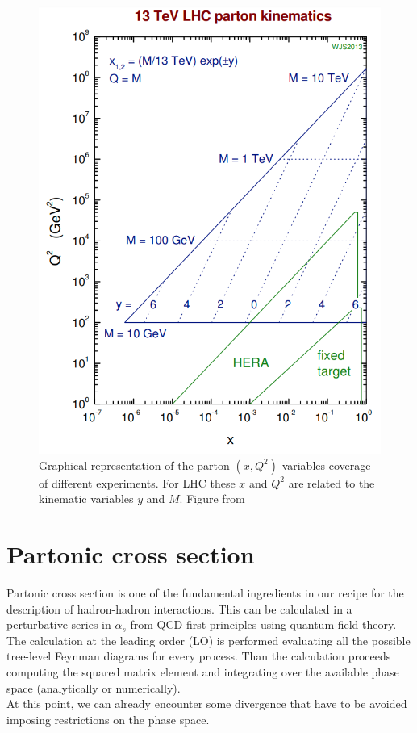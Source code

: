 \begin{figure}[!ht]
	\centering 	
	\includegraphics[width=12cm]{img/xQ2planeCoverage.png}
	\caption{Graphical representation of the parton $(x,Q^2)$ variables coverage of different experiments. For LHC these $x$ and $Q^2$ are related to the kinematic variables $y$ and $M$. Figure from \cite{StirlingPrivate}}
		\label{figure:xQ2planeCoverage}
\end{figure}

\section{Partonic cross section}

Partonic cross section is one of the fundamental ingredients in our recipe for the description of hadron-hadron interactions. This can be calculated in a perturbative series in $\alpha_s$ from QCD first principles using quantum field theory.
\\
The calculation at the leading order (LO) is performed evaluating all the possible tree-level Feynman diagrams for every process. Than the calculation proceeds computing the squared matrix element and integrating over the available phase space (analytically or numerically).
\\
At this point, we can already encounter some divergence that have to be avoided imposing restrictions on the phase space.

